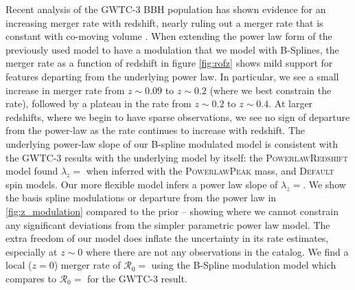Recent analysis of the GWTC-3 BBH population has shown evidence for an increasing merger rate with redshift, nearly ruling out a merger rate that is 
constant with co-moving volume \citep{Fishbach_2018redshift,o3b_astro_dist}. When extending the power law form of the previously used model to have a modulation 
that we model with B-Splines, the merger rate as a function of redshift in figure \ref{fig:rofz} shows mild support for features departing from the underlying power law. 
In particular, we see a small increase in merger rate from $z\sim0.09$ to $z\sim0.2$ (where we best constrain the rate), followed by a plateau in the rate from $z\sim0.2$ to $z\sim0.4$. 
At larger redshifts, where we begin to have sparse observations, we see no sign of departure from the power-law as the rate continues to increase with redshift. 
The underlying power-law slope of our B-spline modulated model is consistent with the GWTC-3 results with the underlying model by itself: the \textsc{PowerlawRedshift} model 
found $\lambda_z = $\result{$\CIPlusMinus{\macros[PLPeak][lamb]}$} when inferred with the \textsc{PowerlawPeak} mass, and \textsc{Default} spin models. Our more 
flexible model infers a power law slope of $\lambda_z = $\result{$\CIPlusMinus{\macros[BSplineIIDCompSpins][lamb]}$}. We show the basis spline modulations or departure 
from the power law in \ref{fig:z_modulation} compared to the prior -- showing where we cannot constrain any significant deviations from the simpler parametric power law model. 
The extra freedom of our model does inflate the uncertainty in its rate estimates, especially at $z\sim0$ where there are not any observations in the catalog. 
We find a local ($z=0$) merger rate of $\mathcal{R}_0 = $ using the B-Spline modulation model 
which compares to $\mathcal{R}_0 = $ for the GWTC-3 result. 